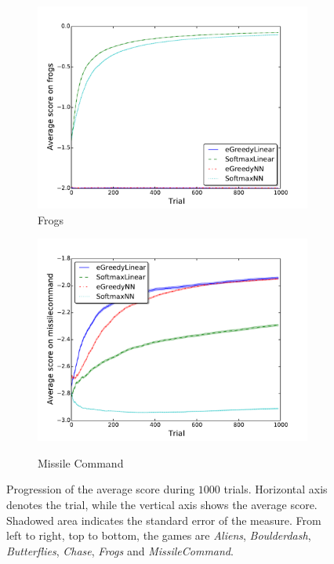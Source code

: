 \documentclass[conference]{IEEEtran}
\begin{document}
\begin{figure}[!t]
\begin{center}
\begin{subfigure} {\lefig\textwidth}
	\includegraphics[width = \textwidth]{img/frogs_scores}
  \caption{Frogs}
\end{subfigure}\begin{subfigure} {\lefig\textwidth}
	\includegraphics[width = \textwidth]{img/missilecommand_scores}\\  
  \caption{Missile Command}
\end{subfigure}
	\caption{Progression of the average score during $1000$ trials. Horizontal axis denotes the trial, while the vertical axis shows the average score. Shadowed area indicates the standard error of the measure. From left to right, top to bottom, the games are \textit{Aliens}, \textit{Boulderdash}, \textit{Butterflies}, \textit{Chase}, \textit{Frogs} and \textit{MissileCommand}.}
	\label{fig:results1}
	\end{center}
\end{figure}
\end{document}
